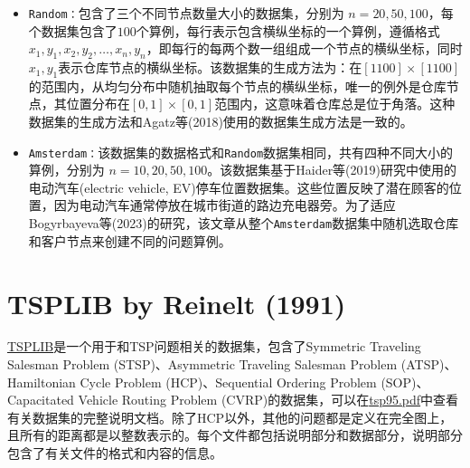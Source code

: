 \begin{itemize}
    \item \texttt{Random：}包含了三个不同节点数量大小的数据集，分别为 $n = 20, 50, 100$，每个数据集包含了$100$个算例，每行表示包含横纵坐标的一个算例，遵循格式 $x_1,y_1,x_2,y_2,\dots,x_n,y_n$，即每行的每两个数一组组成一个节点的横纵坐标，同时 $x_1,y_1$表示仓库节点的横纵坐标。该数据集的生成方法为：在$[1100]\times[1100]$的范围内，从均匀分布中随机抽取每个节点的横纵坐标，唯一的例外是仓库节点，其位置分布在$[0,1]\times[0,1]$范围内，这意味着仓库总是位于角落。这种数据集的生成方法和Agatz等(2018)\cite{agatzOptimizationApproachesTraveling2018}使用的数据集生成方法是一致的。
    \item \texttt{Amsterdam：}该数据集的数据格式和\texttt{Random}数据集相同，共有四种不同大小的算例，分别为 $n = 10, 20, 50, 100$。该数据集基于Haider等(2019)\cite{haiderOptimizingRelocationOperations2019}研究中使用的电动汽车(electric vehicle, EV)停车位置数据集。这些位置反映了潜在顾客的位置，因为电动汽车通常停放在城市街道的路边充电器旁。为了适应Bogyrbayeva等(2023)\cite{bogyrbayevaDeepReinforcementLearning2023}的研究，该文章从整个\texttt{Amsterdam}数据集中随机选取仓库和客户节点来创建不同的问题算例。
\end{itemize}

\section{TSPLIB by Reinelt (1991)}
\href{http://comopt.ifi.uni-heidelberg.de/software/TSPLIB95/}{TSPLIB}是一个用于和TSP问题相关的数据集，包含了Symmetric Traveling Salesman Problem (STSP)、Asymmetric Traveling Salesman Problem (ATSP)、Hamiltonian Cycle Problem (HCP)、Sequential Ordering Problem (SOP)、Capacitated Vehicle Routing Problem (CVRP)的数据集，可以在\href{http://comopt.ifi.uni-heidelberg.de/software/TSPLIB95/tsp95.pdf}{tsp95.pdf}中查看有关数据集的完整说明文档。除了HCP以外，其他的问题都是定义在完全图上，且所有的距离都是以整数表示的。每个文件都包括说明部分和数据部分，说明部分包含了有关文件的格式和内容的信息。


